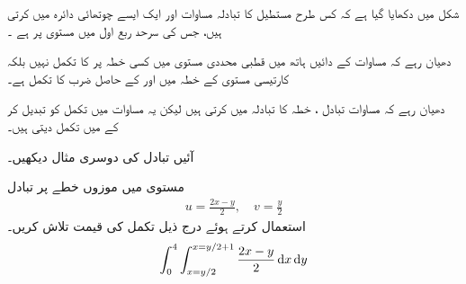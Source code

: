 شکل  میں دکھایا گیا ہے کہ کس طرح  مستطیل  کا تبادلہ مساوات  اور   ایک  ایسے چوتھائی دائرہ  میں کرتی ہیں، جس کی سرحد  ربع اول میں مستوی  پر  ہے ۔

دھیان رہے کہ مساوات  کے دائیں ہاتھ میں قطبی محددی مستوی میں کسی خطہ پر  کا تکمل نہیں  بلکہ  کارتیسی  مستوی کے خطہ  میں    اور  کے حاصل ضرب کا تکمل ہے۔

دھیان رہے کہ مساوات تبادل ،  خطہ  کا تبادلہ  میں کرتی ہیں لیکن  یہ مساوات  میں تکمل کو تبدیل کر کے   میں تکمل  دیتی ہیں۔

آئیں تبادل کی دوسری مثال دیکھیں۔

  مستوی   میں موزوں خطے پر   تبادل  
\begin{align}\label{مساوات_بالکثرت_بدل_مثال}
u=\frac{2x-y}{2},\quad v=\frac{y}{2}
\end{align}
 استعمال کرتے  ہوئے درج ذیل  تکمل کی قیمت تلاش کریں۔
\begin{align*}
\int_0^4\int_{x=y/2}^{x=y/2+1}\frac{2x-y}{2}\dif x\dif y
\end{align*}

